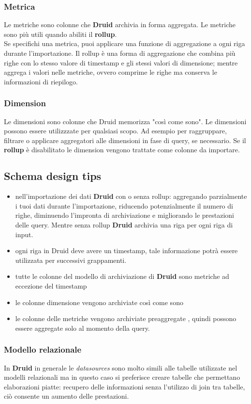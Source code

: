 \documentclass{article}
\begin{document}
\subsubsection{Metrica}
Le metriche sono colonne che \textbf{Druid} archivia in forma aggregata. Le metriche sono più utili quando abiliti il \textbf{rollup}.\\ 
Se specifichi una metrica, puoi applicare una funzione di aggregazione a ogni riga durante l'importazione.
Il rollup è una forma di aggregazione che combina più righe con lo stesso valore di timestamp e gli stessi valori di dimensione; mentre aggrega i valori nelle metriche, ovvero comprime le righe ma conserva le informazioni di riepilogo.
\subsubsection{Dimension}
Le dimensioni sono colonne che Druid memorizza "così come sono". Le dimensioni possono essere utilizzzate per qualsiasi scopo. Ad esempio per  raggruppare, filtrare o applicare aggregatori alle dimensioni in fase di query, se necessario. Se il \textbf{rollup} è disabilitato le dimension vengono trattate come colonne da importare.
\subsection{Schema design tips}
\begin{itemize}
   

 \item nell'importazione dei dati \textbf{Druid} con o senza rollup: aggregando parzialmente i tuoi dati durante l'importazione, riducendo potenzialmente il numero di righe, diminuendo l'impronta di archiviazione e migliorando le prestazioni delle query. Mentre senza rollup \textbf{Druid} archivia una riga per ogni riga di input.
 \item ogni riga in Druid deve avere un timestamp, tale informazione potrà essere utilizzata per successivi grappamenti.
 \item tutte le colonne del modello di archiviazione di     \textbf{Druid} sono metriche ad eccezione del timestamp
 \item le colonne dimensione vengono archiviate così come sono
 \item le colonne delle metriche vengono archiviate preaggregate , quindi possono essere aggregate solo al momento della query.
\end{itemize}
\subsubsection{Modello relazionale}
In \textbf{Druid} in generale le \textit{datasources} sono molto simili alle tabelle utilizzate nel modelli relazionali ma in questo caso si preferisce creare tabelle che permettano elaborazioni piatte: recupero delle informazioni senza l'utilizzo di join tra tabelle, ciò consente un aumento delle prestazioni.
\end{document}
